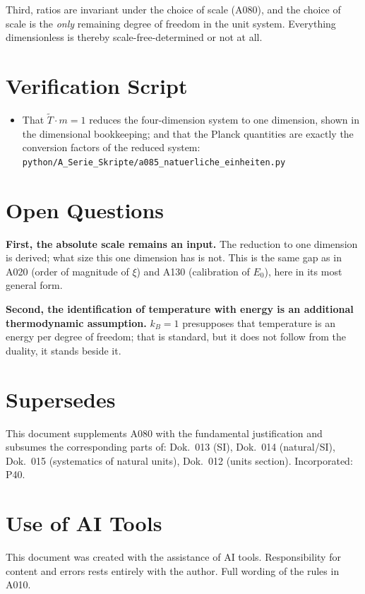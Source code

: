 Third, ratios are invariant under the choice of scale (A080), and the choice
of scale is the \emph{only} remaining degree of freedom in the unit system.
Everything dimensionless is thereby scale-free-determined or not at all.

\section{Verification Script}

\begin{itemize}
  \item That $\tilde T\cdot m=1$ reduces the four-dimension system to one
    dimension, shown in the dimensional bookkeeping; and that the Planck
    quantities are exactly the conversion factors of the reduced system:
    \texttt{python/A\_Serie\_Skripte/a085\_natuerliche\_einheiten.py}
\end{itemize}

\section{Open Questions}

\textbf{First, the absolute scale remains an input.} The reduction to one
dimension is derived; what size this one dimension has is not. This is the same
gap as in A020 (order of magnitude of $\xi$) and A130 (calibration of $E_0$),
here in its most general form.

\textbf{Second, the identification of temperature with energy is an additional
thermodynamic assumption.} $k_B=1$ presupposes that temperature is an energy
per degree of freedom; that is standard, but it does not follow from the
duality, it stands beside it.

\section{Supersedes}

This document supplements A080 with the fundamental justification and subsumes
the corresponding parts of: Dok.~013 (SI), Dok.~014 (natural/SI), Dok.~015
(systematics of natural units), Dok.~012 (units section). Incorporated: P40.

\section{Use of AI Tools}

This document was created with the assistance of AI tools.
Responsibility for content and errors rests entirely with the author.
Full wording of the rules in A010.
